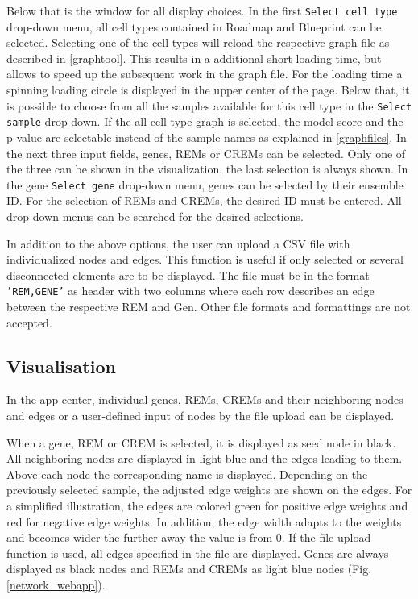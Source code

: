 \documentclass[pdftex,12pt,a4paper]{report}
\begin{document}
Below that is the window for all display choices. In the first \texttt{Select cell type} drop-down menu, all cell types contained in Roadmap\cite{roadmap} and Blueprint\cite{blueprint} can be selected. Selecting one of the cell types will reload the respective graph file as described in \ref{graphtool}. This results in a additional short loading time, but allows to speed up the subsequent work in the graph file. For the loading time a spinning loading circle is displayed in the upper center of the page. Below that, it is possible to choose from all the samples available for this cell type in the \texttt{Select sample} drop-down. If the all cell type graph is selected, the model score and the p-value are selectable instead of the sample names as explained in \ref{graphfiles}. In the next three input fields, genes, REMs or CREMs can be selected. Only one of the three can be shown in the visualization, the last selection is always shown. In the gene \texttt{Select gene} drop-down menu, genes can be selected by their ensemble ID. For the selection of REMs and CREMs, the desired ID must be entered. All drop-down menus can be searched for the desired selections. 

In addition to the above options, the user can upload a CSV file with individualized nodes and edges. This function is useful if only selected or several disconnected elements are to be displayed. The file must be in the format \texttt{'REM,GENE'} as header with two columns where each row describes an edge between the respective REM and Gen. Other file formats and formattings are not accepted.

\subsection{Visualisation}
In the app center, individual genes, REMs, CREMs and their neighboring nodes and edges or a user-defined input of nodes by the file upload can be displayed.

When a gene, REM or CREM is selected, it is displayed as seed node in black. All neighboring nodes are displayed in light blue and the edges leading to them. Above each node the corresponding name is displayed. Depending on the previously selected sample, the adjusted edge weights are shown on the edges. For a simplified illustration, the edges are colored green for positive edge weights and red for negative edge weights. In addition, the edge width adapts to the weights and becomes wider the further away the value is from 0. If the file upload function is used, all edges specified in the file are displayed. Genes are always displayed as black nodes and REMs and CREMs as light blue nodes (Fig. \ref{network_webapp}). 
\end{document}
